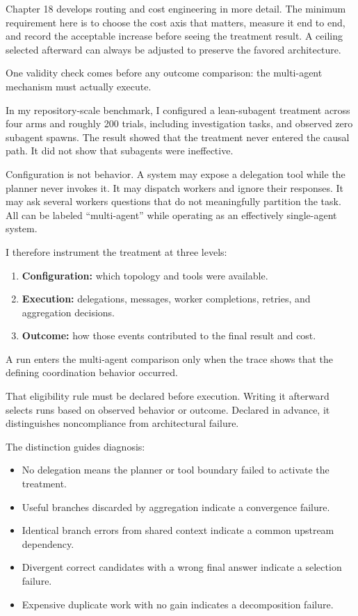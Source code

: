 Chapter 18 develops routing and cost engineering in more detail. The minimum requirement here is to choose the cost axis that matters, measure it end to end, and record the acceptable increase before seeing the treatment result. A ceiling selected afterward can always be adjusted to preserve the favored architecture.

One validity check comes before any outcome comparison: the multi-agent mechanism must actually execute.

In my repository-scale benchmark, I configured a lean-subagent treatment across four arms and roughly 200 trials, including investigation tasks, and observed zero subagent spawns. The result showed that the treatment never entered the causal path. It did not show that subagents were ineffective.

Configuration is not behavior. A system may expose a delegation tool while the planner never invokes it. It may dispatch workers and ignore their responses. It may ask several workers questions that do not meaningfully partition the task. All can be labeled ``multi-agent'' while operating as an effectively single-agent system.


I therefore instrument the treatment at three levels:

\begin{enumerate}
\def\labelenumi{\arabic{enumi}.}
\tightlist
\item
  \textbf{Configuration:} which topology and tools were available.
\item
  \textbf{Execution:} delegations, messages, worker completions, retries, and aggregation decisions.
\item
  \textbf{Outcome:} how those events contributed to the final result and cost.
\end{enumerate}

A run enters the multi-agent comparison only when the trace shows that the defining coordination behavior occurred.

That eligibility rule must be declared before execution. Writing it afterward selects runs based on observed behavior or outcome. Declared in advance, it distinguishes noncompliance from architectural failure.


The distinction guides diagnosis:

\begin{itemize}
\tightlist
\item
  No delegation means the planner or tool boundary failed to activate the treatment.
\item
  Useful branches discarded by aggregation indicate a convergence failure.
\item
  Identical branch errors from shared context indicate a common upstream dependency.
\item
  Divergent correct candidates with a wrong final answer indicate a selection failure.
\item
  Expensive duplicate work with no gain indicates a decomposition failure.
\end{itemize}

